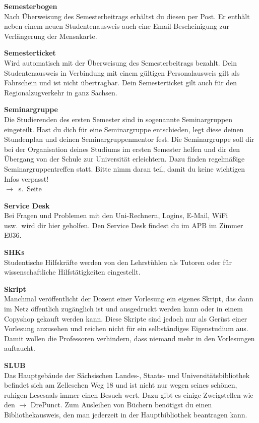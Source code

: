 \begin{multicols}{2}
\textbf{Semesterbogen} \\
Nach Überweisung des Semesterbeitrags erhältst du diesen per Post.
Er enthält neben einem neuen Studentenausweis auch eine Email-Bescheinigung zur Verlängerung der Mensakarte.

\textbf{Semesterticket} \\
Wird automatisch mit der Überweisung des Semesterbeitrags bezahlt.
Dein Studentenausweis in Verbindung mit einem gültigen Personalausweis gilt als Fahrschein und ist nicht übertragbar.
Dein Semesterticket gilt auch für den Regionalzugverkehr in ganz Sachsen.

\textbf{Seminargruppe} \\
Die Studierenden des ersten Semester sind in sogenannte Seminargruppen eingeteilt. Hast du dich für eine Seminargruppe entschieden, legt diese deinen Stundenplan und deinen Seminargruppenmentor fest. Die Se\-mi\-nar\-grup\-pe soll dir bei der Organisation deines Studiums im ersten Semester helfen und dir den Übergang von der Schule zur Universität erleichtern. Dazu finden regelmäßige Seminargruppentreffen statt. Bitte nimm daran teil, damit du keine wichtigen Infos verpasst! \\
$\rightarrow$~s.~Seite~\pageref{sec:seminargruppen}

\textbf{Service Desk} \\
Bei Fragen und Problemen mit den Uni-Rechnern, Logins, E-Mail, WiFi usw.\ wird dir hier geholfen. Den Service Desk findest du im APB im Zimmer E036.

\vfill\columnbreak%

\textbf{SHKs} \\
Studentische Hilfskräfte werden von den Lehrstühlen als Tutoren oder für wissenschaftliche Hilfstätigkeiten eingestellt.

\textbf{Skript} \\
Manchmal veröffentlicht der Dozent einer Vorlesung ein eigenes Skript, das dann im Netz öffentlich zugänglich ist und ausgedruckt werden kann oder in einem Copyshop gekauft werden kann.
Diese Skripte sind jedoch nur als Gerüst einer Vorlesung anzusehen und reichen nicht für ein selbständiges Eigenstudium aus.
Damit wollen die Professoren verhindern, dass niemand mehr in den Vorlesungen auftaucht.

\textbf{SLUB} \\
Das Hauptgebäude der Sächsischen Landes-, Staats- und Universitätsbibliothek~ befindet sich am Zelleschen Weg 18 und ist nicht nur wegen seines schönen, ruhigen Lesesaals immer einen Besuch wert.
Dazu gibt es einige Zweigstellen wie den $\rightarrow$ DrePunct.
Zum Ausleihen von Büchern benötigst du einen Bibliothekausweis, den man jederzeit in der Hauptbibliothek beantragen kann.


\end{multicols}
